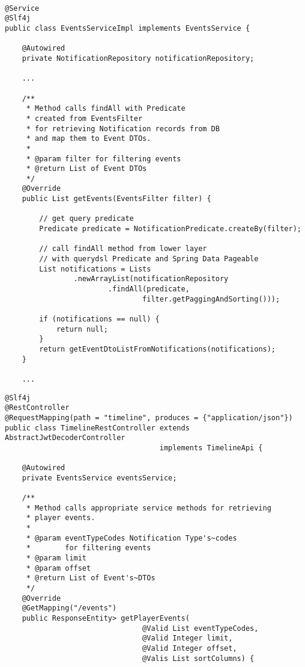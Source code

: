 \documentclass[twoside, 12pt]{article}
\begin{document}
{{\clearpage


\begin{lstlisting}

@Service
@Slf4j
public class EventsServiceImpl implements EventsService {

    @Autowired
    private NotificationRepository notificationRepository;

    ...

    /**
     * Method calls findAll with Predicate
     * created from EventsFilter
     * for retrieving Notification records from DB
     * and map them to Event DTOs.
     *
     * @param filter for filtering events
     * @return List of Event DTOs
     */
    @Override
    public List getEvents(EventsFilter filter) {

        // get query predicate
        Predicate predicate = NotificationPredicate.createBy(filter);

        // call findAll method from lower layer
        // with querydsl Predicate and Spring Data Pageable
        List notifications = Lists
                .newArrayList(notificationRepository
                        .findAll(predicate,
                                filter.getPaggingAndSorting()));

        if (notifications == null) {
            return null;
        }
        return getEventDtoListFromNotifications(notifications);
    }

    ...

\end{lstlisting}

\clearpage


\begin{lstlisting}
@Slf4j
@RestController
@RequestMapping(path = "timeline", produces = {"application/json"})
public class TimelineRestController extends AbstractJwtDecoderController
                                    implements TimelineApi {

    @Autowired
    private EventsService eventsService;

    /**
     * Method calls appropriate service methods for retrieving
     * player events.
     *
     * @param eventTypeCodes Notification Type's~codes
     *        for filtering events
     * @param limit
     * @param offset
     * @return List of Event's~DTOs
     */
    @Override
    @GetMapping("/events")
    public ResponseEntity> getPlayerEvents(
                                @Valid List eventTypeCodes,
                                @Valid Integer limit,
                                @Valid Integer offset,
                                @Valis List sortColumns) {


\end{lstlisting}}}
\end{document}
